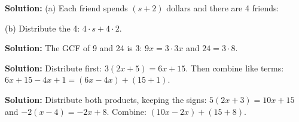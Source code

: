 \documentclass[12pt]{article}
\begin{document}
\textbf{Solution:} (a) Each friend spends $(s + 2)$ dollars and there are 4 friends:

(b) Distribute the 4: $4 \cdot s + 4 \cdot 2$. 


\textbf{Solution:} The GCF of 9 and 24 is 3: $9x = 3 \cdot 3x$ and $24 = 3 \cdot 8$.


\textbf{Solution:} Distribute first: $3(2x + 5) = 6x + 15$. Then combine like terms:
$6x + 15 - 4x + 1 = (6x - 4x) + (15 + 1)$. 


\textbf{Solution:} Distribute both products, keeping the signs:
$5(2x + 3) = 10x + 15$ and $-2(x - 4) = -2x + 8$. Combine:
$(10x - 2x) + (15 + 8)$. 
\end{document}
